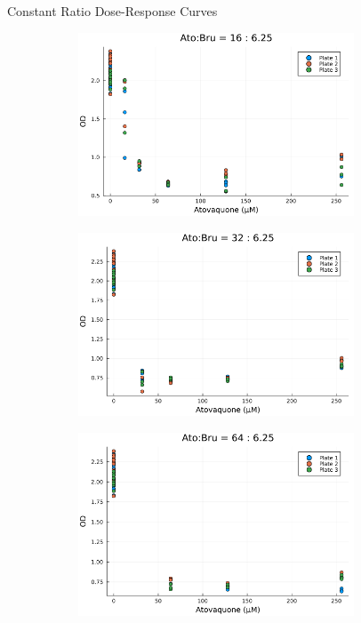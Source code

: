 \documentclass{beamer}
\begin{document}
\begin{frame}{Constant Ratio Dose-Response Curves}
    \begin{figure}[b]
        \centering
        \begin{subfigure}{0.5\textwidth}
            \centering
            \includegraphics[width=0.9\textwidth]{figs/constant_rate_16to6.25.png}
        \end{subfigure}%
        \begin{subfigure}{0.5\textwidth}
            \centering
            \includegraphics[width=0.9\textwidth]{figs/constant_rate_32to6.25.png}
        \end{subfigure}
        \begin{subfigure}{0.5\textwidth}
            \centering
            \includegraphics[width=0.9\textwidth]{figs/constant_rate_64to6.25.png}

\end{subfigure}
\end{figure}
\end{frame}
\end{document}
